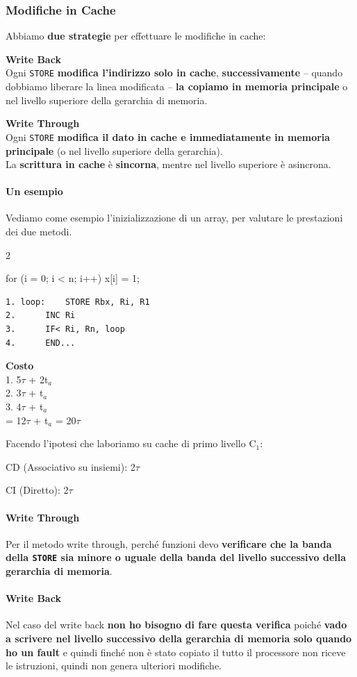\documentclass[10pt]{report}
\begin{document}
\subsubsection{Modifiche in Cache}
Abbiamo \textbf{due strategie} per effettuare le modifiche in cache:
\begin{list}{}{}
	\item \textbf{Write Back}\\
	Ogni \texttt{STORE} \textbf{modifica l'indirizzo solo in cache}, \textbf{successivamente} -- quando dobbiamo liberare la linea modificata -- \textbf{la copiamo in memoria principale} o nel livello superiore della gerarchia di memoria.
	\item \textbf{Write Through}\\
	Ogni \texttt{STORE} \textbf{modifica il dato in cache e immediatamente in memoria principale} (o nel livello superiore della gerarchia).\\
	La \textbf{scrittura in cache} è \textbf{sincorna}, mentre nel livello superiore è asincrona.
\end{list}
\pagebreak
\paragraph{Un esempio} Vediamo come esempio l'inizializzazione di un array, per valutare le prestazioni dei due metodi.
\begin{multicols}{2}
\begin{C}
for (i = 0; i < n; i++) x[i] = 1;
\end{C}
\begin{lstlisting}
1. loop:	STORE Rbx, Ri, R1
2.		INC Ri
3.		IF< Ri, Rn, loop
4.		END...
\end{lstlisting}
\columnbreak
\textbf{Costo}\\
	1. 5$\tau$ + 2t$_a$\\
	2. 3$\tau$ + t$_a$\\
	3. 4$\tau$ + t$_a$\\
	= 12$\tau$ + t$_a$ = 20$\tau$
\end{multicols}
\begin{list}{}{Facendo l'ipotesi che laboriamo su cache di primo livello C$_1$:}
	\item CD (Associativo su insiemi): 2$\tau$
	\item CI (Diretto): 2$\tau$
\end{list}
\paragraph{Write Through} Per il metodo write through, perché funzioni devo \textbf{verificare che la banda della \texttt{STORE} sia minore o uguale della banda del livello successivo della gerarchia di memoria}.
\paragraph{Write Back} Nel caso del write back \textbf{non ho bisogno di fare questa verifica} poiché \textbf{vado a scrivere nel livello successivo della gerarchia di memoria solo quando ho un fault} e quindi finché non è stato copiato il tutto il processore non riceve le istruzioni, quindi non genera ulteriori modifiche.
\end{document}
